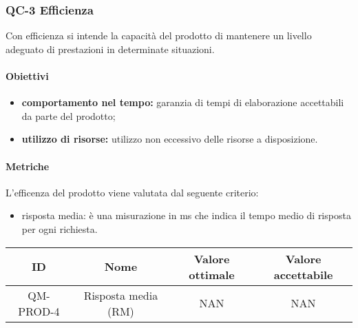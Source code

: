 \subsubsection{QC-3 Efficienza}
Con efficienza si intende la capacità del prodotto di mantenere un livello adeguato di prestazioni in determinate situazioni.
	\paragraph{Obiettivi}
		\begin{itemize}
			\item \textbf{comportamento nel tempo:} garanzia di tempi di elaborazione accettabili da parte del prodotto;
			\item \textbf{utilizzo di risorse:} utilizzo non eccessivo delle risorse a disposizione.
		\end{itemize}
	\paragraph{Metriche}
	L'efficenza del prodotto viene valutata dal seguente criterio:
	\begin{itemize}
		\item risposta media: è una misurazione in ms che indica il tempo medio di risposta per ogni richiesta.
	\end{itemize}
	\begin{center}
		\begin{tabular}{|c|c|c|c|}
			\rowcolor{lighter-grayer}
			\hline
			ID & Nome & Valore ottimale & Valore accettabile \\
			\hline
			QM-PROD-4 & Risposta media (RM) & NAN & NAN \\
			\hline
		\end{tabular}
	\end{center}
